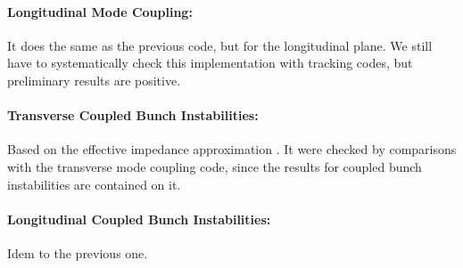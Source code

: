  

 \paragraph{Longitudinal Mode Coupling:} It does the same as the previous code, but for the longitudinal plane. We still have to systematically check this implementation with tracking codes, but preliminary results are positive.
 
 \paragraph{Transverse Coupled Bunch Instabilities:} Based on the effective impedance approximation \cite{Chao1993}. It were checked by comparisons with the transverse mode coupling code, since the results for coupled bunch instabilities are contained on it.
 
 \paragraph{Longitudinal Coupled Bunch Instabilities:} Idem to the previous one.
 
